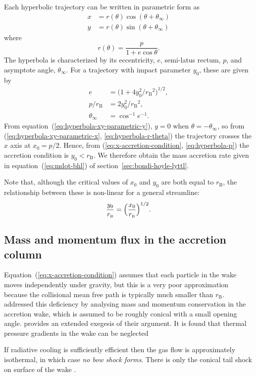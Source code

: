 \documentclass[useAMS, usenatbib, a4paper]{mnras}
\newcommand\bhl{\ensuremath{_{\mathrm{\scriptscriptstyle B}}}}
\begin{document}
Each hyperbolic trajectory can be written in parametric form as
\begin{align}
  \label{eq:hyperbola-xy-parametric-x}
  x &= r(\theta) \cos(\theta + \theta_\infty) \\
  \label{eq:hyperbola-xy-parametric-y}
  y &= r(\theta) \sin(\theta + \theta_\infty)
\end{align}
where
\begin{equation}
  \label{eq:hyperbola-r-theta}
  r(\theta) = \frac{p}{1 + e \cos\theta}.
\end{equation}
The hyperbola is characterized by its eccentricity, \(e\),
semi-latus rectum, \(p\), and asymptote angle, \(\theta_\infty\).
For a trajectory with impact parameter \(y_0\), these are given by
\citetext{e.g., \citealp{Landau:1976a}}
\begin{align}
  \label{eq:hyperbola-eccentricity}
  e & = \bigl( 1 + 4 y_0^2 / r\bhl^2 \bigr)^{1/2},\\
  \label{eq:hyperbola-p}
  p / r\bhl & = 2 y_0^2 / r\bhl^2, \\
  \label{eq:hyperbola-theta-inf}
  \theta_\infty & = \cos^{-1} e^{-1} .
\end{align}
From equation~(\ref{eq:hyperbola-xy-parametric-y}), \(y = 0\) when \(\theta = -\theta_\infty\),
so from (\ref{eq:hyperbola-xy-parametric-x}, \ref{eq:hyperbola-r-theta})
the trajectory crosses the \(x\) axis at \(x_0 = p / 2\).
Hence, from (\ref{eq:x-accretion-condition}, \ref{eq:hyperbola-p})
the accretion condition is \(y_0 < r\bhl\). We therefore obtain the
mass accretion rate given in equation~(\ref{eq:mdot-bhl}) of section~\ref{sec:bondi-hoyle-lyttl}.

Note that, although the critical values of \(x_0\) and \(y_0\) are
both equal to \(r\bhl\),
the relationship between these is non-linear for a general streamline:
\begin{equation}
  \label{eq:y0-vs-x0}
  \frac{y_0}{r\bhl} = \Bigl( \frac{x_0}{r\bhl} \Bigr)^{1/2} .
\end{equation}

\subsection{Mass and momentum flux in the accretion column}
\label{sec:mass-flux-accretion}
Equation~(\ref{eq:x-accretion-condition}) assumes that each particle
in the wake moves independently under gravity, but this is a very
poor approximation because the collisional mean free path is typically
much smaller than \(r\bhl\).
\citet{Bondi:1944a} addressed this deficiency by analysing mass and momentum
conservation in the accretion wake, which is assumed to be roughly conical
with a small opening angle.
\citet{Edgar:2004a} provides an extended exegesis of their argument. 
It is found that thermal pressure gradients in the wake can be neglected 


If radiative cooling is sufficiently efficient then the gas flow is
approximately isothermal, in which case \emph{no bow shock forms}.
There is only the conical tail shock on surface of the wake
\citep{Ruffert:1996a}.

\bsp	%
\label{lastpage}
\end{document}
